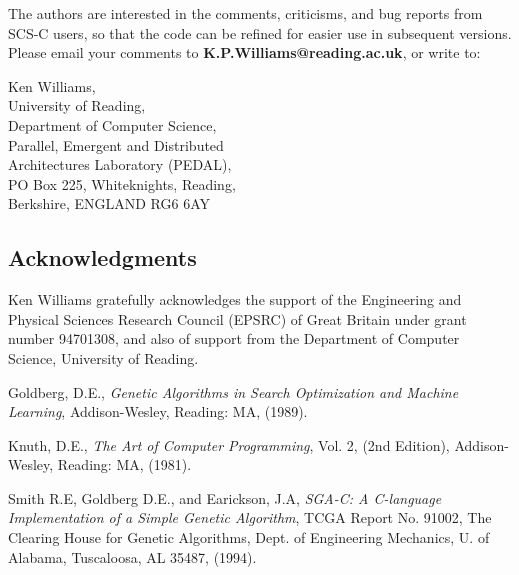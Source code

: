   The authors are interested in the comments, criticisms, 
and bug reports from SCS-C users, so that the code can be 
refined for easier use in subsequent versions. Please email 
your comments to {\bf K.P.Williams@reading.ac.uk}, or write to:

\begin{center} 
Ken Williams,   \\
University of Reading,             \\
Department of Computer Science,    \\
Parallel, Emergent and Distributed\\
Architectures Laboratory (PEDAL),\\
PO Box 225, Whiteknights, Reading,\\
Berkshire, ENGLAND RG6 6AY\\
\end{center} 
 

\subsection*{Acknowledgments}

  Ken Williams gratefully acknowledges the support of the
Engineering and Physical Sciences Research Council (EPSRC)
of Great Britain under grant number 94701308, and also of support
from the Department of Computer Science, University of Reading.  

\newpage

\begin{thebibliography}{99}

 Goldberg, D.E., {\it Genetic Algorithms
in Search Optimization and Machine Learning},
Addison-Wesley, Reading: MA, (1989). 

 Knuth, D.E., {\it The Art of Computer
Programming}, Vol. 2, (2nd Edition), Addison-Wesley, Reading:
MA, (1981).

 Smith R.E, Goldberg D.E., and
Earickson, J.A, {\it  SGA-C: A C-language
Implementation of a Simple Genetic Algorithm},
TCGA Report No. 91002, The Clearing House for Genetic
Algorithms, Dept. of Engineering Mechanics, U. of Alabama, 
Tuscaloosa, AL 35487, (1994).

\end{thebibliography}




